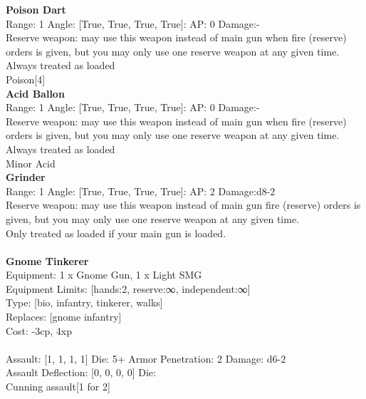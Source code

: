 {\bf Poison Dart } \\



Range: 1  Angle: [True, True, True, True]: AP: 0 Damage:- \\
Reserve weapon: may use this weapon instead of main gun when fire (reserve) orders is given, but you may only use one reserve weapon at any given time.\\ 
Always treated as loaded\\ 
Poison[4]\\ 




{\bf Acid Ballon } \\



Range: 1  Angle: [True, True, True, True]: AP: 0 Damage:- \\
Reserve weapon: may use this weapon instead of main gun when fire (reserve) orders is given, but you may only use one reserve weapon at any given time.\\ 
Always treated as loaded\\ 
Minor Acid\\ 




{\bf Grinder } \\



Range: 1  Angle: [True, True, True, True]: AP: 2 Damage:d8-2 \\
Reserve weapon: may use this weapon instead of main gun fire (reserve) orders is given, but you may only use one reserve weapon at any given time.\\ 
Only treated as loaded if your main gun is loaded.\\ 




 
\ \\

{\bf Gnome Tinkerer } \\
Equipment: 1 x Gnome Gun, 1 x Light SMG \\
Equipment Limits: [hands:2, reserve:∞, independent:∞] \\
Type: [bio, infantry, tinkerer, walks] \\
Replaces: [gnome infantry] \\
Cost: -3cp, 4xp\\
\ \\
Assault: [1, 1, 1, 1] Die: 5+ Armor Penetration: 2 Damage: d6-2 \\
Assault Deflection: [0, 0, 0, 0] Die: \\
\indent Cunning assault[1 for 2]\\ 
 
